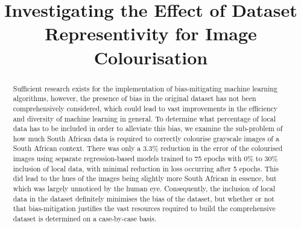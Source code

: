 \documentclass[conference]{IEEEtran}
\begin{document}
\title{Investigating the Effect of Dataset Representivity for Image Colourisation}

\author{
\and
{} 
\and
{}
}

\maketitle

\begin{abstract}

Sufficient research exists for the implementation of bias-mitigating machine learning algorithms, however, the presence of bias in the original dataset has not been comprehensively considered, which could lead to vast improvements in the efficiency and diversity of machine learning in general. To determine what percentage of local data has to be included in order to alleviate this bias, we examine the sub-problem of how much South African data is required to correctly colourise grayscale images of a South African context. There was only a 3.3\% reduction in the error of the colourised images using separate regression-based models trained to 75 epochs with 0\% to 30\% inclusion of local data, with minimal reduction in loss occurring after 5 epochs. This did lead to the hues of the images being slightly more South African in essence, but which was largely unnoticed by the human eye. Consequently, the inclusion of local data in the dataset definitely minimises the bias of the dataset, but whether or not that bias-mitigation justifies the vast resources required to build the comprehensive dataset is determined on a case-by-case basis.

\end{abstract}
\end{document}
